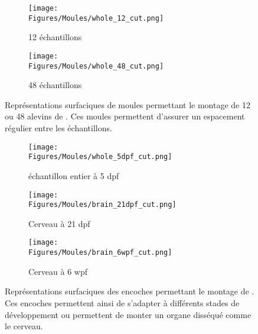 \documentclass[\main/main.tex]{subfiles}
\begin{document}
\begin{figure}[h!]
    \centering
    \begin{subfigure}[b]{0.57\textwidth}
       \caption{
            \label{fig:tampon:12}
            12 échantillons
            }
       \centering \texttt{[image: \\Figures/Moules/whole\_12\_cut.png]}
    \end{subfigure}
    \begin{subfigure}[b]{0.38\textwidth}
       \caption{
        \label{fig:tampon:48}
        48 échantillons
        }
       \centering \texttt{[image: \\Figures/Moules/whole\_48\_cut.png]}
    \end{subfigure}
    \caption{
        \label{fig:tampon}
        Représentations surfaciques de moules permettant le montage de 12 ou 48 alevins de \pzs{}.
        Ces moules permettent d'assurer un espacement régulier entre les échantillons.
    }
    
\end{figure}

\begin{figure}[h!]
    \centering
    \begin{subfigure}[b]{0.37674418604651162790697674418605\textwidth}
       \caption{
            \label{fig:formes:whole_5dpf}
            échantillon entier à 5 dpf
            }
       \centering \texttt{[image: \\Figures/Moules/whole\_5dpf\_cut.png]}
    \end{subfigure}
    \begin{subfigure}[b]{0.26162790697674418604651162790698\textwidth}
       \caption{
            \label{fig:formes:brain_21dpf}
            Cerveau à 21 dpf
            }
       \centering \texttt{[image: \\Figures/Moules/brain\_21dpf\_cut.png]}
    \end{subfigure}
    \begin{subfigure}[b]{0.26162790697674418604651162790698\textwidth}
       \caption{
            \label{fig:formes:brain_6wpf}
            Cerveau à 6 wpf
            }
       \centering \texttt{[image: \\Figures/Moules/brain\_6wpf\_cut.png]}
    \end{subfigure}
    \caption{
        \label{fig:formes}
        Représentations surfaciques des encoches permettant le montage de \pzs. Ces encoches permettent ainsi de s'adapter à différents stades de développement ou permettent de monter un organe disséqué comme le cerveau.
    }
    
\end{figure}
    
\end{document}
